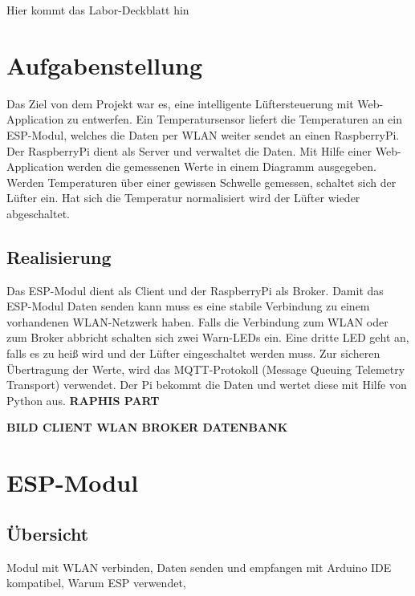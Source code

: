 \documentclass[paper=a4, 12pt]{scrreprt}
\begin{document}
Hier kommt das Labor-Deckblatt hin
%


\tableofcontents

\newpage

\chapter{Aufgabenstellung}
Das Ziel von dem Projekt war es, eine intelligente Lüftersteuerung mit Web-Application zu entwerfen.
Ein Temperatursensor liefert die Temperaturen an ein ESP-Modul, welches die Daten per WLAN weiter sendet an einen RaspberryPi. Der RaspberryPi dient als Server und verwaltet die Daten. Mit Hilfe einer Web-Application werden die gemessenen Werte in einem Diagramm ausgegeben. Werden Temperaturen über einer gewissen Schwelle gemessen, schaltet sich der Lüfter ein. Hat sich die Temperatur normalisiert wird der Lüfter wieder abgeschaltet.

\section{Realisierung}
Das ESP-Modul dient als Client und der RaspberryPi als Broker.
Damit das ESP-Modul Daten senden kann muss es eine stabile Verbindung zu einem vorhandenen WLAN-Netzwerk haben. Falls die Verbindung zum WLAN oder zum Broker abbricht schalten sich zwei Warn-LEDs ein. Eine dritte LED geht an, falls es zu heiß wird und der Lüfter eingeschaltet werden muss. 
Zur sicheren Übertragung der Werte, wird das MQTT-Protokoll (Message Queuing Telemetry Transport) verwendet. Der Pi bekommt die Daten und wertet diese mit Hilfe von Python aus.\textbf{ RAPHIS PART}

\textbf{BILD CLIENT WLAN BROKER DATENBANK}

\chapter{ESP-Modul}
\section{Übersicht}
Modul mit WLAN verbinden, Daten senden und empfangen mit Arduino IDE kompatibel, Warum ESP verwendet,
\end{document}

